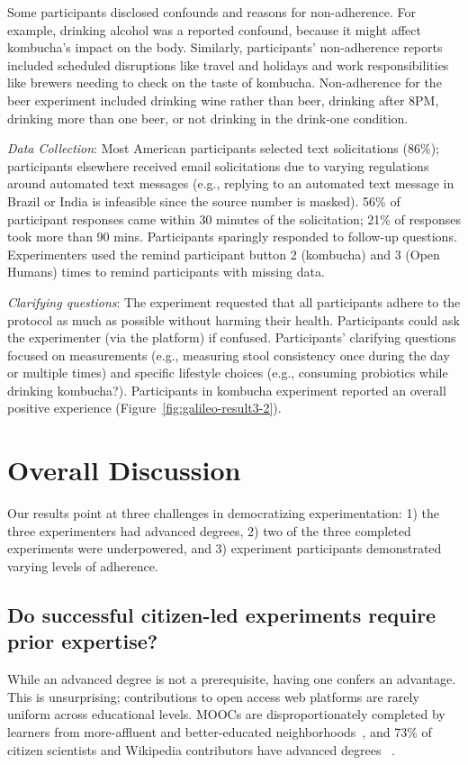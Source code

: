 Some participants disclosed confounds and reasons for non-adherence. For example, drinking alcohol was a reported confound, because it might affect kombucha's impact on the body. Similarly, participants' non-adherence reports included scheduled disruptions like travel and holidays and work responsibilities like brewers needing to check on the taste of kombucha. Non-adherence for the beer experiment included drinking wine rather than beer, drinking after 8PM, drinking more than one beer, or not drinking in the drink-one condition.

\textit{Data Collection}: Most American participants selected text solicitations (86\%); participants elsewhere received email solicitations due to varying regulations around automated text messages (e.g., replying to an automated text message in Brazil or India is infeasible since the source number is masked). 56\% of participant responses came within 30 minutes of the solicitation; 21\% of responses took more than 90 mins. Participants sparingly responded to follow-up questions. Experimenters used the remind participant button 2 (kombucha) and 3 (Open Humans) times to remind participants with missing data.

\textit{Clarifying questions}: The experiment requested that all participants adhere to the protocol as much as possible without harming their health. Participants could ask the experimenter (via the platform) if confused. Participants' clarifying questions focused on measurements (e.g., measuring stool consistency once during the day or multiple times) and specific lifestyle choices (e.g., consuming probiotics while drinking kombucha?). Participants in kombucha experiment reported an overall positive experience (Figure~\ref{fig:galileo-result3-2}).

\section{Overall Discussion}
Our results point at three challenges in democratizing experimentation: 1) the three experimenters had advanced degrees, 2) two of the three completed experiments were underpowered, and 3) experiment participants demonstrated varying levels of adherence. 

\subsection{Do successful citizen-led experiments require prior expertise?}
While an advanced degree is not a prerequisite, having one confers an advantage. This is unsurprising; contributions to open access web platforms are rarely uniform across educational levels. MOOCs are disproportionately completed by learners from more-affluent and better-educated neighborhoods~\cite{hansen2015democratizing}, and 73\% of citizen scientists and Wikipedia contributors have advanced degrees~\cite{national2018learning, Wikipedia} . 


